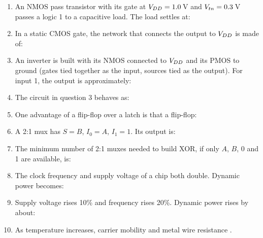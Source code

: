 \begin{enumerate}
  \item An NMOS pass transistor with its gate at $V_{DD} = 1.0$\,V and $V_{tn} = 0.3$\,V passes a logic 1 to a capacitive load. The load settles at:

  \item In a static CMOS gate, the network that connects the output to $V_{DD}$ is made of:

  \item An inverter is built with its NMOS connected to $V_{DD}$ and its PMOS to ground (gates tied together as the input, sources tied as the output). For input 1, the output is approximately:

  \item The circuit in question 3 behaves as:

  \item One advantage of a flip-flop over a latch is that a flip-flop:

  \item A 2:1 mux has $S = B$, $I_0 = A$, $I_1 = 1$. Its output is:

  \item The minimum number of 2:1 muxes needed to build XOR, if only $A$, $B$, 0 and 1 are available, is:

  \item The clock frequency and supply voltage of a chip both double. Dynamic power becomes:
  \opts{$2\times$}{$4\times$}{$16\times$}{$8\times$}

  \item Supply voltage rises 10\% and frequency rises 20\%. Dynamic power rises by about:

  \item As temperature increases, carrier mobility \underline{\hspace{1.5cm}} and metal wire resistance \underline{\hspace{1.5cm}}.


\end{enumerate}
